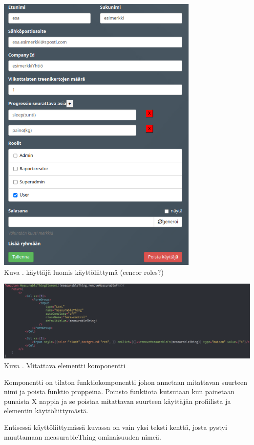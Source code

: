 \bigskip
\includegraphics[width = 10cm]{src/public/oppar/adminUserProfilePost.png}\\
Kuva \getImgCount {}. käyttäjä luomis käyttöliittymä (cencor roles?)
\bigskip


\includegraphics[width = 15cm]{src/public/oppar/measurableElementComponent.png}\\
Kuva \getImgCount {}. Mitattava elementti komponentti
\medskip

Komponentti on tilaton funktiokomponentti johon annetaan mitattavan suurteen nimi ja poista funktio proppeina.
Poinsto funktiota kutsutaan kun painetaan punaista X nappia ja se poistaa mitattavan suurteen käyttäjän profiilista ja elementin käyttöliittymästä.
\medskip


\iffalse
Entisessä käyttöliittymässä kuvassa \nextImageCount {} on vain yksi teksti kenttä, josta pystyi muuttamaan measurableThing ominaisuuden nimeä.

